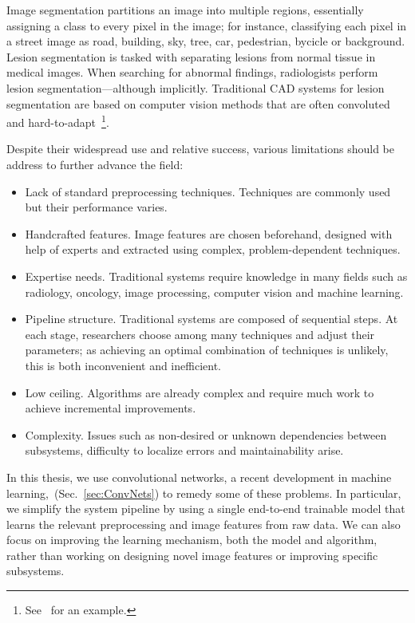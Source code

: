 Image segmentation partitions an image into multiple regions, essentially assigning a class to every pixel in the image; for instance, classifying each pixel in a street image as road, building, sky, tree, car, pedestrian, bycicle or background. Lesion segmentation is tasked with separating lesions from normal tissue in medical images. When searching for abnormal findings, radiologists perform lesion segmentation---although implicitly. Traditional CAD systems for lesion segmentation are based on computer vision methods that are often convoluted and hard-to-adapt~\footnote{See~\cite{Ashraf2013} for an example.}. 

Despite their widespread use and relative success, various limitations should be address to further advance the field:
\begin{itemize}
	\item Lack of standard preprocessing techniques. Techniques are commonly used but their performance varies.
	\item Handcrafted features. Image features are chosen beforehand, designed with help of experts and extracted using complex, problem-dependent techniques.
	\item Expertise needs. Traditional systems require knowledge in many fields such as radiology, oncology, image processing, computer vision and machine learning.
	\item Pipeline structure. Traditional systems are composed of sequential steps. At each stage, researchers choose among many techniques and adjust their parameters; as achieving an optimal combination of techniques is unlikely, this is both inconvenient and inefficient.
	\item Low ceiling. Algorithms are already complex and require much work to achieve incremental improvements.
	\item Complexity. Issues such as non-desired or unknown dependencies between subsystems, difficulty to localize errors and maintainability arise. 
\end{itemize}

In this thesis, we use convolutional networks, a recent development in machine learning,~(Sec.~\ref{sec:ConvNets}) to remedy some of these problems. In particular, we simplify the system pipeline by using a single end-to-end trainable model that learns the relevant preprocessing and image features from raw data. We can also focus on improving the learning mechanism, both the model and algorithm, rather than working on designing novel image features or improving specific subsystems.
